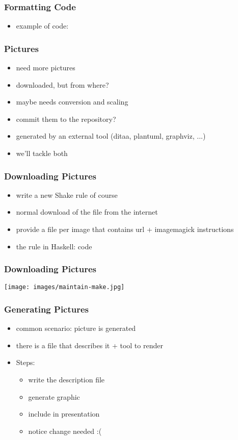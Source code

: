 \documentclass{beamer}
\begin{document}
\begin{frame}
  \frametitle{Formatting Code}
  \begin{itemize}
  \item example of code:
  \end{itemize}
\end{frame}

\begin{frame}
  \frametitle{Pictures}
  \begin{itemize}
  \item need more pictures
  \item downloaded, but from where?
  \item maybe needs conversion and scaling
  \item commit them to the repository?
  \item generated by an external tool (ditaa, plantuml, graphviz, ...)
  \item we'll tackle both
  \end{itemize}
\end{frame}

\begin{frame}
  \frametitle{Downloading Pictures}
  \begin{itemize}
  \item write a new Shake rule of course
  \item normal download of the file from the internet
  \item provide a file per image that contains url + imagemagick instructions
  \item the rule in Haskell: code
  \end{itemize}
\end{frame}

\begin{frame}
  \frametitle{Downloading Pictures}
  \texttt{[image: images/maintain-make.jpg]}
\end{frame}

\begin{frame}
  \frametitle{Generating Pictures}
  \begin{itemize}
  \item common scenario: picture is generated
  \item there is a file that describes it + tool to render
  \item Steps:
    \begin{itemize}
    \item write the description file
    \item generate graphic
    \item include in presentation
    \item notice change needed :(
    \end{itemize}
  \end{itemize}
\end{frame}
\end{document}
